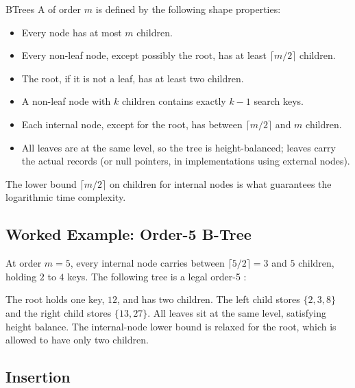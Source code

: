 \documentclass[hidelinks]{article}
\begin{document}
\begin{smodule}[title={B-Trees}]{BTrees}
A  of order $m$ is defined by the following shape properties:
\begin{itemize}
  \item Every node has at most $m$ children.
  \item Every non-leaf node, except possibly the root, has at least $\lceil m/2 \rceil$ children.
  \item The root, if it is not a leaf, has at least two children.
  \item A non-leaf node with $k$ children contains exactly $k-1$ search keys.
  \item Each internal node, except for the root, has between $\lceil m/2 \rceil$ and $m$ children.
  \item All leaves are at the same level, so the tree is height-balanced; leaves carry the actual records (or null pointers, in implementations using external nodes).
\end{itemize}
The lower bound $\lceil m/2 \rceil$ on children for internal nodes is what guarantees the logarithmic time complexity.

\subsection{Worked Example: Order-5 B-Tree}

\begin{example}
At order $m = 5$, every internal node carries between $\lceil 5/2 \rceil = 3$ and $5$ children, holding $2$ to $4$ keys. The following tree is a legal order-5 :
\begin{center}
\end{center}
The root holds one key, $12$, and has two children. The left child stores $\{2, 3, 8\}$ and the right child stores $\{13, 27\}$. All leaves sit at the same level, satisfying height balance. The internal-node lower bound is relaxed for the root, which is allowed to have only two children.
\end{example}

\subsection{Insertion}


\end{smodule}
\end{document}
